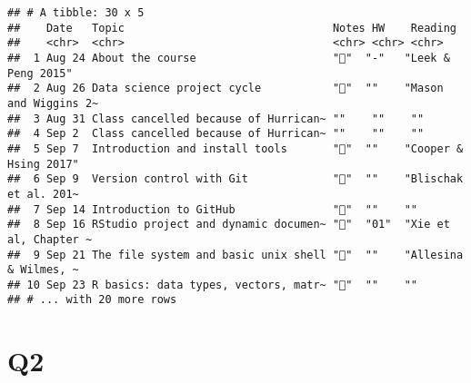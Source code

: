 \documentclass[
]{article}
\begin{document}
\begin{verbatim}
## # A tibble: 30 x 5
##    Date   Topic                                Notes HW    Reading              
##    <chr>  <chr>                                <chr> <chr> <chr>                
##  1 Aug 24 About the course                     "📙"  "-"   "Leek & Peng 2015"   
##  2 Aug 26 Data science project cycle           "📙"  ""    "Mason and Wiggins 2~
##  3 Aug 31 Class cancelled because of Hurrican~ ""    ""    ""                   
##  4 Sep 2  Class cancelled because of Hurrican~ ""    ""    ""                   
##  5 Sep 7  Introduction and install tools       "📙"  ""    "Cooper & Hsing 2017"
##  6 Sep 9  Version control with Git             "📙"  ""    "Blischak et al. 201~
##  7 Sep 14 Introduction to GitHub               "📙"  ""    ""                   
##  8 Sep 16 RStudio project and dynamic documen~ "📙"  "01"  "Xie et al, Chapter ~
##  9 Sep 21 The file system and basic unix shell "📙"  ""    "Allesina & Wilmes, ~
## 10 Sep 23 R basics: data types, vectors, matr~ "📙"  ""    ""                   
## # ... with 20 more rows
\end{verbatim}

\hypertarget{q2}{%
\section{Q2}\label{q2}}
\end{document}
